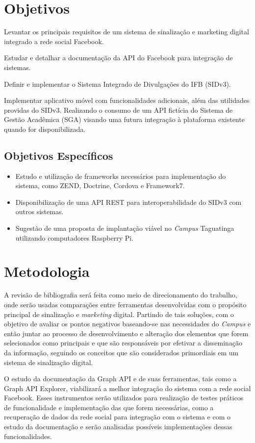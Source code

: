 \section{Objetivos}
Levantar os principais requisitos de um sistema de sinalização e marketing digital integrado a rede social Facebook.

Estudar e detalhar a documentação da API do Facebook para integração de sistemas.

Definir e implementar o Sistema Integrado de Divulgações do IFB (SIDv3).

Implementar aplicativo móvel com funcionalidades adicionais, além das utilidades providas do SIDv3. Realizando o consumo de um API fictícia do Sistema de Gestão Acadêmica (SGA) visando uma futura integração à plataforma existente quando for disponibilizada.

\subsection{Objetivos Específicos}
	 \begin{itemize}
	\item Estudo e utilização de frameworks necessários para implementação do sistema, como ZEND, Doctrine, Cordova e Framework7.
	 	
	\item Disponibilização de uma API REST para interoperabilidade do SIDv3 com outros sistemas.
	
	\item Sugestão de uma proposta de implantação viável no \textit{Campus} Taguatinga utilizando computadores Raspberry Pi.
	\end{itemize}
	
\section{Metodologia}
A revisão de bibliografia será feita como meio de direcionamento do trabalho, onde serão usadas comparações entre ferramentas desenvolvidas com o propósito principal de sinalização e \textit{marketing} digital. Partindo de tais soluções, com o objetivo de avaliar os pontos negativos baseando-se nas necessidades do \textit{Campus} e então juntar ao processo de desenvolvimento e alteração dos elementos que forem selecionados como principais e que são responsáveis por efetivar a disseminação da informação, seguindo os conceitos que são considerados primordiais em um sistema de sinalização digital.

O estudo da documentação da Graph API e de suas ferramentas, tais como a Graph API Explorer, viabilizará a melhor integração do sistema com a rede social Facebook. Esses instrumentos serão utilizados para realização de testes práticos de funcionalidade e implementação das que forem necessárias, como a recuperação de dados da rede social para integração com o sistema e com o estudo da documentação e serão analisadas possíveis implementações dessas funcionalidades.
	 
